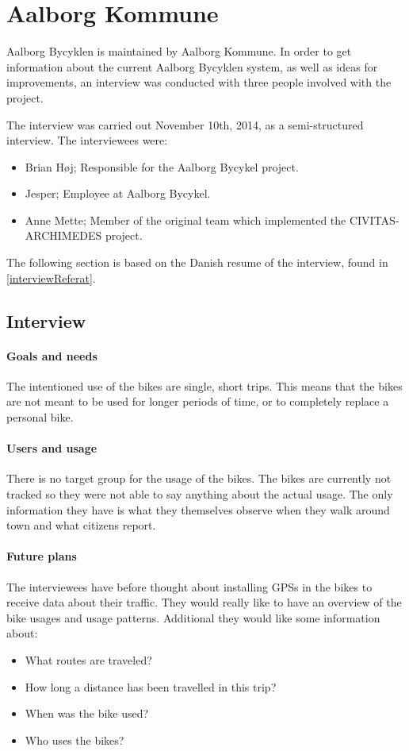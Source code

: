 \section{Aalborg Kommune}
Aalborg Bycyklen is maintained by Aalborg Kommune.
In order to get information about the current Aalborg Bycyklen system, as well as ideas for improvements, an interview was conducted with three people involved with the project.

The interview was carried out November 10th, 2014, as a semi-structured interview.
The interviewees were:
\begin{itemize}
\item Brian Høj; Responsible for the Aalborg Bycykel project.
\item Jesper; Employee at Aalborg Bycykel.
\item Anne Mette; Member of the original team which implemented the CIVITAS-ARCHIMEDES project.
\end{itemize}

The following section is based on the Danish resume of the interview, found in \cref{interviewReferat}.

\subsection{Interview}

\paragraph{Goals and needs} \label{interview:goals}
The intentioned use of the bikes are single, short trips.
This means that the bikes are not meant to be used for longer periods of time, or to completely replace a personal bike.

\paragraph{Users and usage}
There is no target group for the usage of the bikes.
The bikes are currently not tracked so they were not able to say anything about the actual usage.
The only information they have is what they themselves observe when they walk around town and what citizens report.

\paragraph{Future plans}
The interviewees have before thought about installing GPSs in the bikes to receive data about their traffic.
They would really like to have an overview of the bike usages and usage patterns.
Additional they would like some information about:
\begin{itemize}
\item What routes are traveled?
\item How long a distance has been travelled in this trip?
\item When was the bike used?
\item Who uses the bikes?
\end{itemize}

